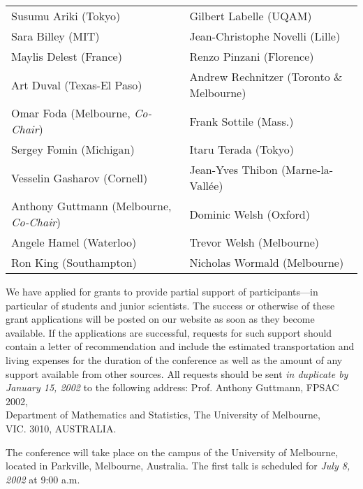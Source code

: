 
\medskip



\begin{tabular}{ll}
Susumu Ariki (Tokyo)\qquad & Gilbert Labelle (UQAM)\\
Sara Billey (MIT) \qquad & Jean-Christophe Novelli (Lille)\\
Maylis Delest (France) \qquad & Renzo Pinzani (Florence)\\
Art Duval (Texas-El Paso)\qquad & Andrew Rechnitzer (Toronto \&
Melbourne)\\
Omar Foda (Melbourne, {\it Co-Chair})\qquad &
Frank Sottile  (Mass.)\\
Sergey Fomin (Michigan)\qquad & Itaru Terada (Tokyo)\\
Vesselin Gasharov (Cornell) \qquad & Jean-Yves Thibon (Marne-la-Vall{\'
e}e)\\
Anthony Guttmann (Melbourne, {\it Co-Chair})\qquad & Dominic Welsh
(Oxford)\\
Angele Hamel (Waterloo)\qquad & Trevor Welsh (Melbourne)\\
Ron King (Southampton) \qquad & Nicholas Wormald (Melbourne)
\end{tabular}



\noindent
We have applied for grants to provide
partial support of participants---in  particular of students and junior
scientists.  The success or otherwise of these grant applications
will be posted on our website as soon as they become available.
If the applications are successful, requests for such support
should contain a letter of recommendation and
include the estimated transportation and living expenses for the duration
of the  conference as well as the amount of any support available from
other  sources. All requests should be sent {\em in duplicate by January
15,  2002\/} to the following address:
\noindent
Prof. Anthony Guttmann, FPSAC 2002,\\
Department of Mathematics and Statistics, The University of Melbourne,\\
VIC. 3010, AUSTRALIA.\\


\noindent
The conference will take place on the campus of the University of
Melbourne, located in Parkville, Melbourne, Australia.
The first talk is scheduled for {\it July 8, 2002} at 9:00 a.m.

